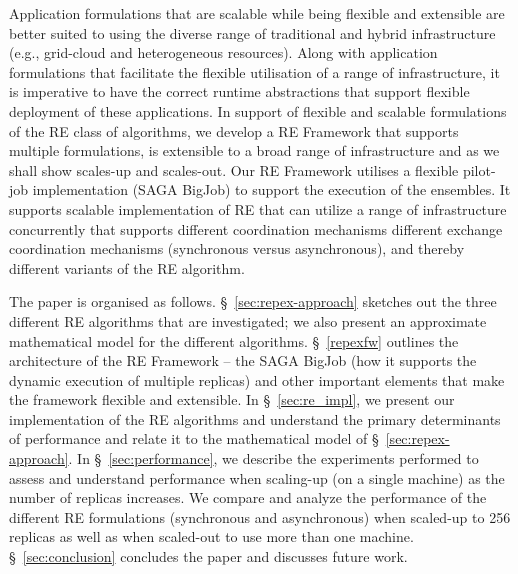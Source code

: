 \documentclass{rspublic}
\newcommand{\jhanote}[1]{ {\textcolor{red} { ***shantenu: #1 }}}
\newcommand{\jhanote}[1]{}
\begin{document}
Application formulations that are scalable while being flexible and
extensible are better suited to using the diverse range of traditional
and hybrid infrastructure (e.g., grid-cloud and heterogeneous
resources). Along with application formulations that facilitate the
flexible utilisation of a range of infrastructure, it is imperative to
have the correct runtime abstractions that support flexible
deployment of these applications.  In support of flexible and scalable
formulations of the RE class of algorithms, we develop a RE Framework
that supports multiple formulations, is extensible to a broad range of
infrastructure and as we shall show scales-up and scales-out.  Our RE
Framework utilises a flexible pilot-job implementation (SAGA BigJob)
to support the execution of the ensembles.  It supports scalable
implementation of RE that can utilize a range of infrastructure
concurrently that supports different coordination mechanisms different
exchange coordination mechanisms (synchronous versus asynchronous),
and thereby different variants of the RE algorithm.  



The paper is organised as follows. \S~\ref{sec:repex-approach}
sketches out the three different RE algorithms that are investigated;
we also present an approximate mathematical model for the different
algorithms.  \S~\ref{repexfw} outlines the architecture of the RE
Framework -- the SAGA BigJob (how it supports the dynamic execution of
multiple replicas) and other important elements that make the
framework flexible and extensible.  In \S~\ref{sec:re_impl}, we
present our implementation of the RE algorithms and understand the
primary determinants of performance and relate it to the mathematical
model of \S~\ref{sec:repex-approach}.  In \S~\ref{sec:performance}, we
describe the experiments performed to assess and understand
performance when scaling-up (on a single machine) as the number of
replicas increases.  We compare and analyze the performance of the
different RE formulations (synchronous and asynchronous) when
scaled-up to 256 replicas as well as when scaled-out to use more than
one machine.  \S~\ref{sec:conclusion} concludes the paper and
discusses future work.
\end{document}
